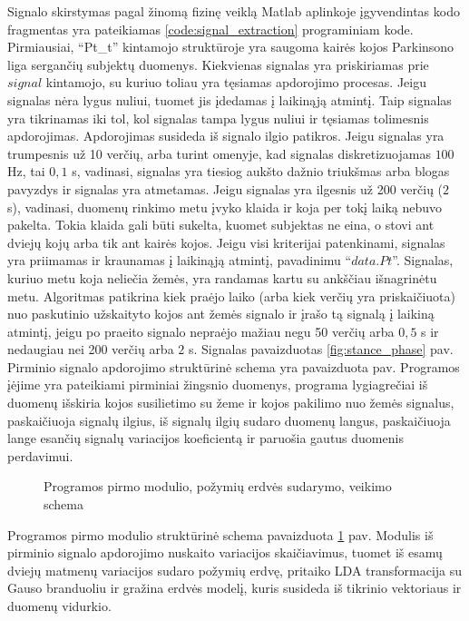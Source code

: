 \documentclass[]{vgtuef}
\begin{document}
Signalo skirstymas pagal žinomą fizinę veiklą Matlab aplinkoje įgyvendintas kodo fragmentas yra pateikiamas \ref{code:signal_extraction} programiniam kode. Pirmiausiai, ``Pt\_t'' kintamojo struktūroje yra saugoma kairės kojos Parkinsono liga sergančių subjektų duomenys. Kiekvienas signalas yra priskiriamas prie $signal$ kintamojo, su kuriuo toliau yra tęsiamas apdorojimo procesas. Jeigu signalas nėra lygus nuliui, tuomet jis įdedamas į laikinąją atmintį. Taip signalas yra tikrinamas iki tol, kol signalas tampa lygus nuliui ir tęsiamas tolimesnis apdorojimas. Apdorojimas susideda iš signalo ilgio patikros. Jeigu signalas yra trumpesnis už 10 verčių, arba turint omenyje, kad signalas diskretizuojamas $100$ Hz, tai $0,1$ s, vadinasi, signalas yra tiesiog aukšto dažnio triukšmas arba blogas pavyzdys ir signalas yra atmetamas. Jeigu signalas yra ilgesnis už 200 verčių ($2$ s), vadinasi, duomenų rinkimo metu įvyko klaida ir koja per tokį laiką nebuvo pakelta. Tokia klaida gali būti sukelta, kuomet subjektas ne eina, o stovi ant dviejų kojų arba tik ant kairės kojos. Jeigu visi kriterijai patenkinami, signalas yra priimamas ir kraunamas į laikinąją atmintį, pavadinimu ``$data.Pt$''. Signalas, kuriuo metu koja neliečia žemės, yra randamas kartu su ankščiau išnagrinėtu metu. Algoritmas patikrina kiek praėjo laiko (arba kiek verčių yra priskaičiuota) nuo paskutinio užskaityto kojos ant žemės signalo ir įrašo tą signalą į laikiną atmintį, jeigu po praeito signalo nepraėjo mažiau negu 50 verčių arba $0,5$ s ir nedaugiau nei 200 verčių arba $2$ s. Signalas pavaizduotas \ref{fig:stance_phase} pav. Pirminio signalo apdorojimo struktūrinė schema yra pavaizduota pav. Programos įėjime yra pateikiami pirminiai žingsnio duomenys, programa lygiagrečiai iš duomenų išskiria kojos susilietimo su žeme ir kojos pakilimo nuo žemės signalus, paskaičiuoja signalų ilgius, iš signalų ilgių sudaro duomenų langus, paskaičiuoja lange esančių signalų variacijos koeficientą ir paruošia gautus duomenis perdavimui.

\begin{figure}
  \centering
  
  \caption{Programos pirmo modulio, požymių erdvės sudarymo, veikimo schema}
  \label{fig:pirma_faze}
\end{figure}

Programos pirmo modulio struktūrinė schema pavaizduota \ref{fig:pirma_faze} pav. Modulis iš pirminio signalo apdorojimo nuskaito variacijos skaičiavimus, tuomet iš esamų dviejų matmenų variacijos sudaro požymių erdvę, pritaiko LDA transformacija su Gauso branduoliu ir gražina erdvės modelį, kuris susideda iš tikrinio vektoriaus ir duomenų vidurkio.
\end{document}
